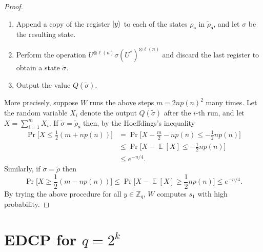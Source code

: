 \documentclass[11pt]{article}
\theoremstyle{plain}
\theoremstyle{definition}
\DeclareMathOperator{\E}{\mathbb{E}}
\DeclarePairedDelimiter{\ldbrac}{\lvert}{\rangle}
\def\Z{\ensuremath{\mathbb{Z}}}
\begin{document}
\begin{proof}
    \begin{enumerate}[topsep = 1pt, itemsep = 1pt, parsep = 1pt]
    \item Append a copy of the register $\ldbrac{y}$ to each of the states $\rho_{\bm{s}}$ in $\tilde{\rho}_{\bm{s}}$, and let $\sigma$ be the resulting state.
    \item Perform the operation $U^{\otimes \ell(n)} \sigma (U^*)^{\otimes \ell(n)}$ and discard the last register to obtain a state $\tilde{\sigma}$.
    \item Output the value $Q(\tilde{\sigma})$.        
    \end{enumerate}
    More precisely, suppose $W$ runs the above steps $m = 2np(n)^2$ many times. Let the random variable $X_i$ denote the output $Q(\tilde{\sigma})$ after the $i$-th run, and let $X = \sum_{i = 1}^m X_i$. If $\tilde{\sigma} = \tilde{\rho}_{\bm{s}}$ then, by the Hoeffdings's inequality
    \begin{align*}
        \Pr\Big[ X \le \frac{1}{2} (m + np(n)) \Big]
        & = \Pr\Big[ X - \frac{m}{2} - np(n) \le -\frac{1}{2}np(n) \Big] \\
        & \le \Pr\Big[ X - \E[X] \le -\frac{1}{2}np(n) \Big] \\
        & \le e^{-n / 4}.
    \end{align*}
    Similarly, if $\tilde{\sigma} = \tilde{\rho}$ then
    \[ \Pr\Big[ X \ge \frac{1}{2} (m - np(n)) \Big] \le \Pr\Big[ X - \E[X] \ge \frac{1}{2}np(n) \Big] \le e^{-n / 4}. \]
    By trying the above procedure for all $y \in \Z_q$, $W$ computes $s_1$ with high probability.
\end{proof}






\section{EDCP for \boldmath${q = 2^k}$\unboldmath}
\end{document}
